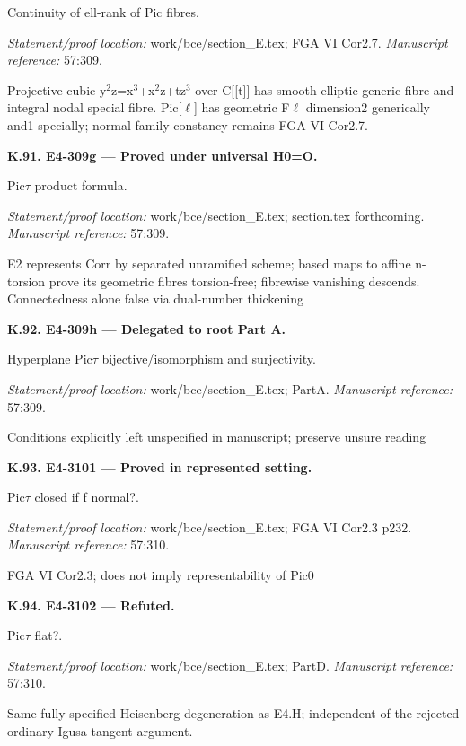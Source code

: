 Continuity of ell-rank of Pic fibres.
\par\emph{Statement/proof location:} work/bce/section\_E.tex; FGA VI Cor2.7.
\emph{Manuscript reference:} 57:309.
\par Projective cubic y\ensuremath{{}^2}z=x\ensuremath{{}^3}+x\ensuremath{{}^2}z+tz\ensuremath{{}^3} over C[[t]] has smooth elliptic generic fibre and integral nodal special fibre. Pic[\ensuremath{\ell}] has geometric F\ensuremath{\ell} dimension2 generically and1 specially; normal-family constancy remains FGA VI Cor2.7.
\par\medskip\noindent\textbf{K.91. E4-309g --- Proved under universal H0=O.}\par
Pic\ensuremath{\tau} product formula.
\par\emph{Statement/proof location:} work/bce/section\_E.tex; section.tex forthcoming.
\emph{Manuscript reference:} 57:309.
\par E2 represents Corr by separated unramified scheme; based maps to affine n-torsion prove its geometric fibres torsion-free; fibrewise vanishing descends. Connectedness alone false via dual-number thickening
\par\medskip\noindent\textbf{K.92. E4-309h --- Delegated to root Part A.}\par
Hyperplane Pic\ensuremath{\tau} bijective/isomorphism and surjectivity.
\par\emph{Statement/proof location:} work/bce/section\_E.tex; PartA.
\emph{Manuscript reference:} 57:309.
\par Conditions explicitly left unspecified in manuscript; preserve unsure reading
\par\medskip\noindent\textbf{K.93. E4-3101 --- Proved in represented setting.}\par
Pic\ensuremath{\tau} closed if f normal?.
\par\emph{Statement/proof location:} work/bce/section\_E.tex; FGA VI Cor2.3 p232.
\emph{Manuscript reference:} 57:310.
\par FGA VI Cor2.3; does not imply representability of Pic0
\par\medskip\noindent\textbf{K.94. E4-3102 --- Refuted.}\par
Pic\ensuremath{\tau} flat?.
\par\emph{Statement/proof location:} work/bce/section\_E.tex; PartD.
\emph{Manuscript reference:} 57:310.
\par Same fully specified Heisenberg degeneration as E4.H; independent of the rejected ordinary-Igusa tangent argument.
